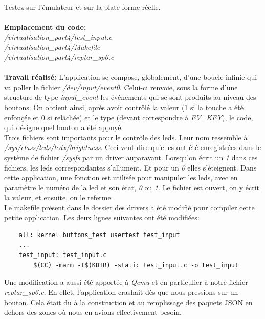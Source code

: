 Testez sur l’émulateur et sur la plate-forme réelle.\\\\
\textbf{Emplacement du code:}\\\textit{/virtualisation\_part4/test\_input.c}\\
\textit{/virtualisation\_part4/Makefile}\\
\textit{/virtualisation\_part4/reptar\_sp6.c}\\\\

\textbf{Travail réalisé: }
L'application se compose, globalement, d'une boucle infinie qui va poller le fichier \textit{/dev/input/event0}. Celui-ci renvoie, sous la forme d'une structure de type \textit{input\_event} les événements qui se sont produits au niveau des boutons. On obtient ainsi, après avoir contrôlé la valeur (1 si la touche a été enfonçée et 0 si relâchée) et le type (devant correspondre à \textit{EV\_KEY}), le code, qui désigne quel bouton a été appuyé.\\
Trois fichiers sont importants pour le contrôle des leds. Leur nom ressemble à \textit{/sys/class/leds/ledx/brightness}. Ceci veut dire qu'elles ont été enregistrées dans le système de fichier \textit{/sysfs} par un driver auparavant. Lorsqu'on écrit un \textit{1} dans ces fichiers, les leds correspondantes s'allument. Et pour un \textit{0} elles s'éteignent. Dans cette application, une fonction est utilisée pour manipuler les leds, avec en paramètre le numéro de la led et son état, \textit{0} ou \textit{1}. Le fichier est ouvert, on y écrit la valeur, et ensuite, on le referme. \\
Le makefile présent dans le dossier des drivers a été modifié pour compiler cette petite application. Les deux lignes suivantes ont été modifiées:
\begin{lstlisting}
	all: kernel buttons_test usertest test_input
	...
	test_input: test_input.c
		$(CC) -marm -I$(KDIR) -static test_input.c -o test_input
\end{lstlisting}
Une modification a aussi été apportée à \textit{Qemu} et en particulier à notre fichier \textit{reptar\_sp6.c}. En effet, l'application crashait dès que nous pressions sur un bouton. Cela était du à la construction et au remplissage des paquets JSON en dehors des zones où nous en avions effectivement besoin.

